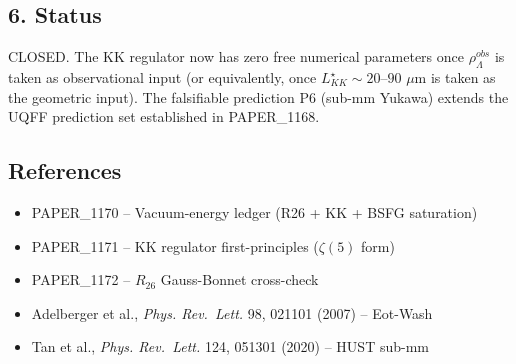 \documentclass[
]{article}
\providecommand{\tightlist}{%
  \setlength{\itemsep}{0pt}\setlength{\parskip}{0pt}}
\begin{document}
\subsection{6. Status}\label{status}

CLOSED. The KK regulator now has zero free numerical parameters once
\(\rho_\Lambda^{obs}\) is taken as observational input (or equivalently,
once \(L_{KK}^\star\sim 20\)--\(90\) \(\mu\)m is taken as the geometric
input). The falsifiable prediction P6 (sub-mm Yukawa) extends the UQFF
prediction set established in PAPER\_1168.

\subsection{References}\label{references}

\begin{itemize}
\tightlist
\item
  PAPER\_1170 -- Vacuum-energy ledger (R26 + KK + BSFG saturation)
\item
  PAPER\_1171 -- KK regulator first-principles (\(\zeta(5)\) form)
\item
  PAPER\_1172 -- \(R_{26}\) Gauss-Bonnet cross-check
\item
  Adelberger et al., \emph{Phys. Rev.~Lett.} 98, 021101 (2007) --
  Eot-Wash
\item
  Tan et al., \emph{Phys. Rev.~Lett.} 124, 051301 (2020) -- HUST sub-mm
\end{itemize}




\end{document}
